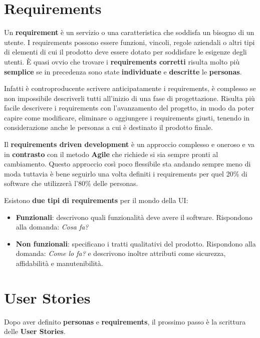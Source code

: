\pagebreak

\section{Requirements}

Un \textbf{requirement} è un servizio o una caratteristica che soddisfa un bisogno di un utente.
I requirements possono essere funzioni, vincoli, regole aziendali o altri tipi di elementi di cui il prodotto deve essere dotato per soddisfare le
esigenze degli utenti. È quasi ovvio che trovare i \textbf{requirements corretti} risulta molto più \textbf{semplice} se in precedenza sono state
\textbf{individuate} e \textbf{descritte} le \textbf{personas}.

Infatti è controproducente scrivere anticipatamente i requirements,
è complesso se non impossibile descriverli tutti all'inizio di una fase di progettazione. Risulta più facile descrivere i requirements con l'avanzamento
del progetto, in modo da poter capire come modificare, eliminare o aggiungere i requirements giusti, tenendo in considerazione anche le personas a cui
è destinato il prodotto finale.

Il \textbf{requirements driven development} è un approccio complesso e oneroso e va in \textbf{contrasto} con il metodo \textbf{Agile} che richiede si
sia sempre pronti al cambiamento. Questo approccio così poco flessibile sta andando sempre meno di moda tuttavia è bene seguirlo una volta definiti i
requirements per quel 20\% di software che utilizzerà l'80\% delle personas.

Esistono \textbf{due tipi di requirements} per il mondo della UI:

\begin{itemize}
	\itemsep-0.3em
	\item \textbf{Funzionali}: descrivono quali funzionalità deve avere il software. Rispondono alla domanda: \textit{Cosa fa?}
	\item \textbf{Non funzionali}: specificano i tratti qualitativi del prodotto. Rispondono alla domanda: \textit{Come lo fa?} e descrivono inoltre
	attributi come sicurezza, affidabilità e manutenibilità.
\end{itemize}

\section{User Stories}
Dopo aver definito \textbf{personas} e \textbf{requirements}, il prossimo passo è la scrittura delle \textbf{User Stories}.

